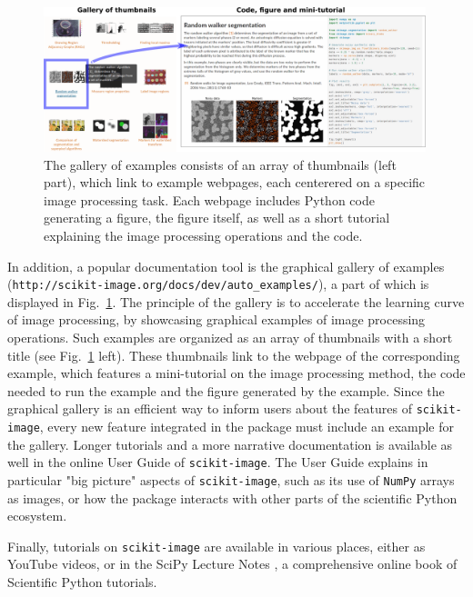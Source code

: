 \documentclass[twocolumn]{bmcart}%
\begin{document}
\begin{figure}
    \centerline{\includegraphics[width=0.99\textwidth]{figure_gallery}}
\caption{
 The gallery of examples consists of an array of thumbnails (left part), which link to example webpages, each centerered on a specific image processing task. Each webpage includes Python code generating a figure, the figure itself, as well as a short tutorial explaining the image processing operations and the code. \label{fig:gallery}}
\end{figure}

In addition, a popular documentation tool is the graphical gallery of
examples (\nolinkurl{http://scikit-image.org/docs/dev/auto_examples/}), a part of which is displayed in Fig.~\ref{fig:gallery}.
The principle of the gallery is to accelerate the learning curve of image
processing, by showcasing graphical examples of image processing
operations. Such examples are organized as an array of thumbnails with a
short title (see Fig.~\ref{fig:gallery} left). These thumbnails link to
the webpage of the corresponding example, which features a mini-tutorial
on the image processing method, the code needed to run the example and
the figure generated by the example. Since the graphical gallery is an
efficient way to inform users about the features of
\texttt{scikit-image}, every new feature integrated in the package must
include an example for the gallery.
Longer tutorials and a more narrative documentation is available as well
in the online User Guide of \texttt{scikit-image}. The User Guide explains in
particular "big picture" aspects of \texttt{scikit-image}, such as its
use of \texttt{NumPy} arrays as images, or how the package interacts with
other parts of the scientific Python ecosystem.

Finally, tutorials on \texttt{scikit-image} are available in various
places, either as YouTube videos, or in the SciPy Lecture
Notes \citep{scipylecturenotes}, a comprehensive online book of Scientific
Python tutorials.  
\end{document}
